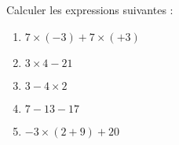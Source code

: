 
\begin{exercice}\label{exosmath-0744}

    Calculer les expressions suivantes :
    \begin{enumerate}
        \item
            \( 7\times (-3)+7\times (+3)\)
        \item
            \( 3\times 4-21\)
        \item
            \( 3-4\times 2\)
        \item
            \( 7-13-17\)
        \item
            \( -3\times (2+9)+20\)
    \end{enumerate}

\end{exercice}
